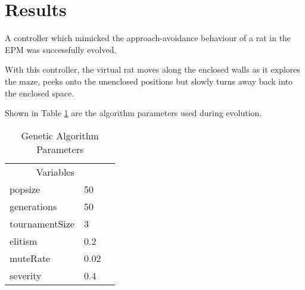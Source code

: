 \section{Results} %

A controller which mimicked the approach-avoidance behaviour of a rat in the EPM was successfully evolved.

With this controller, the virtual rat moves along the enclosed walls as it explores the maze, peeks onto the unenclosed positions but slowly turns away back into the enclosed space.

Shown in  Table \ref{tab:param} are the algorithm parameters used during evolution.

\begin{table}[H]
	\centering
	\begin{tabular}{llr}
		\toprule
		\multicolumn{2}{c}{Variables} \\
		\cmidrule(r){1-2}
		popsize & 50\\
		generations & 50\\
		tournamentSize & 3 \\
		elitism & 0.2\\
		muteRate & 0.02\\
		severity & 0.4\\
		\bottomrule
	\end{tabular}
	\caption{Genetic Algorithm Parameters}
	\label{tab:param} 	
\end{table}


